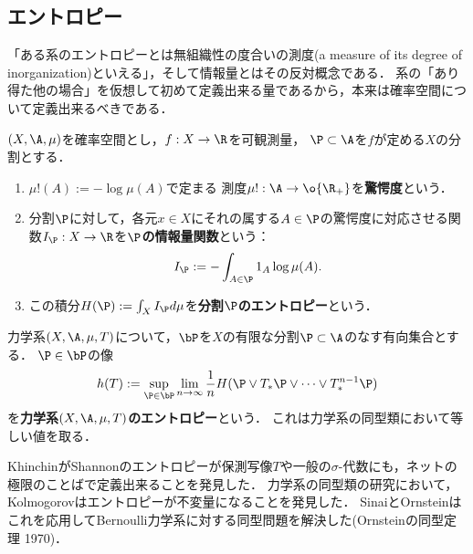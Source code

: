 \documentclass[uplatex,dvipdfmx]{jsreport}
\begin{document}
\subsection{エントロピー}

\begin{tcolorbox}[colframe=ForestGreen, colback=ForestGreen!10!white,breakable,colbacktitle=ForestGreen!40!white,coltitle=black,fonttitle=\bfseries\sffamily,
title=]
    「ある系のエントロピーとは無組織性の度合いの測度(a measure of its degree of inorganization)といえる」\cite{Wiener65-cybernetics}，そして情報量とはその反対概念である．
    系の「あり得た他の場合」を仮想して初めて定義出来る量であるから，本来は確率空間について定義出来るべきである．
\end{tcolorbox}

\begin{definition}
    $(X,\A,\mu)$を確率空間とし，$f:X\to\R$を可観測量，
    $\P\subset\A$を$f$が定める$X$の分割とする．
    \begin{enumerate}
        \item $\mu!(A):=-\log\mu(A)$で定まる
        測度$\mu!:\A\to\o{\R_+}$を\textbf{驚愕度}という．
        \item 分割$\P$に対して，各元$x\in X$にそれの属する$A\in\P$の驚愕度に対応させる関数$I_\P:X\to\R$を\textbf{$\P$の情報量関数}という：
        \[I_\P:=-\int_{A\in\P}1_{A}\log\mu(A).\]
        \item この積分$H(\P):=\int_XI_\P d\mu$を\textbf{分割$\P$のエントロピー}という．
    \end{enumerate}
\end{definition}

\begin{definition}
    力学系$(X,\A,\mu,T)$について，$\bP$を$X$の有限な分割$\P\subset\A$のなす有向集合とする．
    $\P\in\bP$の像
    \[h(T):=\sup_{\P\in\bP}\lim_{n\to\infty}\frac{1}{n}H(\P\lor T_*\P\lor\cdots\lor T_*^{n-1}\P)\]
    を\textbf{力学系$(X,\A,\mu,T)$のエントロピー}という．
    これは力学系の同型類において等しい値を取る．
\end{definition}
\begin{history}
    KhinchinがShannonのエントロピーが保測写像$T$や一般の$\sigma$-代数にも，ネットの極限のことばで定義出来ることを発見した．
    力学系の同型類の研究において，Kolmogorovはエントロピーが不変量になることを発見した．
    SinaiとOrnsteinはこれを応用してBernoulli力学系に対する同型問題を解決した(Ornsteinの同型定理 1970)．
\end{history}
\end{document}
